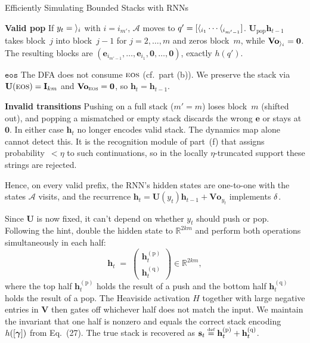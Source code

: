 \begin{question}{Efficiently Simulating Bounded Stacks with RNNs}
\begin{subquestion}
    \textbf{Valid pop} If $y_t = \closeBr{i}$ with $i = i_{m'}$, $\mathcal{A}$ moves to $q' = [\openBr{i_1}\cdots\openBr{i_{m'-1}}]$. 
    $\mathbf{U}_{\text{pop}}\mathbf{h}_{t-1}$ takes block~$j$ into block~$j{-}1$ for $j = 2, \dots, m$ and zeros block~$m$, while $\mathbf{V}\mathbf{o}_{\closeBr{i}} = \mathbf{0}$. 
    The resulting blocks are $(\mathbf{e}_{i_{m'-1}}, \dots, \mathbf{e}_{i_1}, \mathbf{0}, \dots, \mathbf{0})$, exactly $h(q')$.

    \textbf{$\mathtt{eos}$} The DFA does not consume $\eos$ (cf.\ part (b)).
    We preserve the stack via $\mathbf{U}(\eos) = \mathbf{I}_{km}$ and $\mathbf{V}\mathbf{o}_{\eos} = \mathbf{0}$, so $\mathbf{h}_t = \mathbf{h}_{t-1}$.

    \textbf{Invalid transitions} Pushing on a full stack ($m' = m$) loses block~$m$ (shifted out), and popping a mismatched or empty stack discards the wrong $\mathbf{e}$ or stays at $\mathbf{0}$. 
    In either case $\mathbf{h}_t$ no longer encodes valid stack. The dynamics map alone cannot detect this. 
    It is the recognition module of part~(f) that assigns probability~$<\eta$ to such continuations, so in the locally $\eta$-truncated support these strings are rejected.

    Hence, on every valid prefix, the RNN's hidden states are one-to-one with the states $\mathcal{A}$ visits, and the recurrence $\mathbf{h}_t = \mathbf{U}(y_t)\mathbf{h}_{t-1} + \mathbf{V}\mathbf{o}_{y_t}$ implements $\trans$.
\end{subquestion}

\begin{subquestion}
    Since $\mathbf{U}$ is now fixed, it can't depend on whether $y_t$ should push or pop. 
    Following the hint, double the hidden state to $\mathbb{R}^{2km}$ and perform both operations simultaneously in each half:
    \[
        \mathbf{h}_t \;=\; \begin{pmatrix} \mathbf{h}_t^{(\text{p})} \\ \mathbf{h}_t^{(\text{q})} \end{pmatrix} \in \mathbb{R}^{2km},
    \]
    where the top half $\mathbf{h}_t^{(\text{p})}$ holds the result of a push and the bottom half $\mathbf{h}_t^{(\text{q})}$ holds the result of a pop. 
    The Heaviside activation $H$ together with large negative entries in $\mathbf{V}$ then gates off whichever half does not match the input. 
    We maintain the invariant that one half is nonzero and equals the correct stack encoding $h([\stackseq])$ from Eq.~(27). 
    The true stack is recovered as $\mathbf{s}_t \mathrel{\stackrel{\textnormal{\tiny def}}{=}} \mathbf{h}_t^{(\text{p})} + \mathbf{h}_t^{(\text{q})}$.


\end{subquestion}
\end{question}
